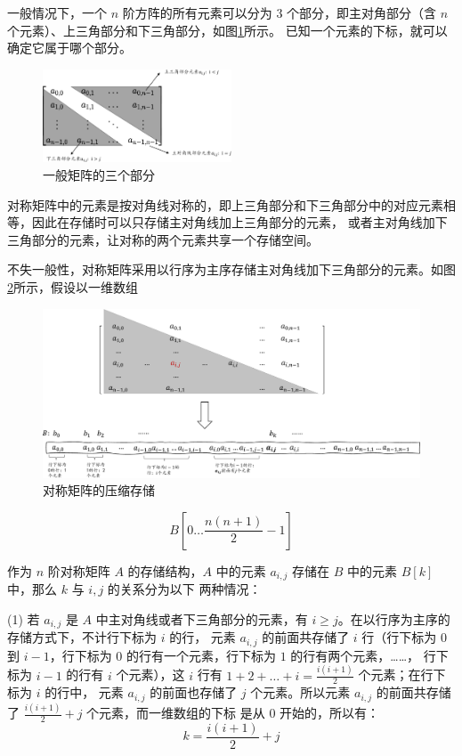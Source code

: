 \documentclass[lang=cn,newtx,10pt,scheme=chinese]{elegantbook}
\begin{document}
一般情况下，一个 $n$ 阶方阵的所有元素可以分为 3 个部分，即主对角部分（含 $n$ 个元素）、上三角部分和下三角部分，如图\ref{fig:common_matrix}所示。
已知一个元素的下标，就可以确定它属于哪个部分。

\begin{figure}[h]
  \centering
  \includegraphics[width=0.5\textwidth]{./figure/pdf/cropped/commonMatrix.pdf}
  \caption{一般矩阵的三个部分}
  \label{fig:common_matrix}
\end{figure}

对称矩阵中的元素是按对角线对称的，即上三角部分和下三角部分中的对应元素相等，因此在存储时可以只存储主对角线加上三角部分的元素，
或者主对角线加下三角部分的元素，让对称的两个元素共享一个存储空间。

不失一般性，对称矩阵采用以行序为主序存储主对角线加下三角部分的元素。如图\ref{fig:downMatrix}所示，假设以一维数组

\begin{figure}
  \centering
  \includegraphics[width=1\textwidth]{./figure/pdf/cropped/downMatrix.pdf}
  \caption{对称矩阵的压缩存储}
  \label{fig:downMatrix}
\end{figure}
\[
B[0 \dots \frac{n(n+1)}{2} - 1]
\]

作为 $n$ 阶对称矩阵 $A$ 的存储结构，$A$ 中的元素 $a_{i,j}$ 存储在 $B$ 中的元素 $B[k]$ 中，那么 $k$ 与 $i,j$ 的关系分为以下
两种情况：

(1) 若 $a_{i,j}$ 是 $A$ 中主对角线或者下三角部分的元素，有 $i \geq j$。在以行序为主序的存储方式下，不计行下标为 $i$ 的行，
元素 $a_{i,j}$ 的前面共存储了 $i$ 行（行下标为 $0$ 到 $i-1$，行下标为 $0$ 的行有一个元素，行下标为 $1$ 的行有两个元素，……，
行下标为 $i-1$ 的行有 $i$ 个元素），这 $i$ 行有 $1 + 2 + \dots + i = \frac{i(i+1)}{2}$ 个元素；在行下标为 $i$ 的行中，
元素 $a_{i,j}$ 的前面也存储了 $j$ 个元素。所以元素 $a_{i,j}$ 的前面共存储了 $\frac{i(i+1)}{2} + j$ 个元素，而一维数组的下标
是从 $0$ 开始的，所以有：
\[
k = \frac{i(i+1)}{2} + j
\]
\end{document}
